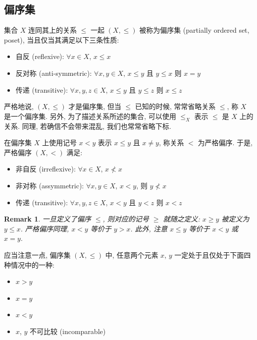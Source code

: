\documentclass[UTF8]{ctexart}
\theoremstyle{mystyle}
\theoremstyle{myremark}
\newtheorem*{remark}{Remark}
\theoremstyle{plain}
\begin{document}
\subsection{偏序集}
\begin{definition}
    集合 $ X $ 连同其上的关系 $ \le $ 一起 $ (X, \le) $ 被称为偏序集 (partially ordered set, poset), 当且仅当其满足以下三条性质:
    \begin{itemize}
        \item 自反 (reflexive): $ \forall x \in X $, $ x \le x $
        \item 反对称 (anti-symmetric): $ \forall x, y \in X $, $ x \le y $ 且 $ y \le x $ 则 $ x = y $
        \item 传递 (transitive): $ \forall x, y, z \in X $, $ x \le y $ 且 $ y \le z $ 则 $ x \le z $
    \end{itemize}
\end{definition}

严格地说, $ (X, \le) $ 才是偏序集, 但当 $ \le $ 已知的时候, 常常省略关系 $ \le $, 称 $ X $ 是一个偏序集. 另外, 为了描述关系所述的集合, 可以使用 $ \le_X $ 表示 $ \le $ 是 $ X $ 上的关系. 同理, 若确信不会带来混乱, 我们也常常省略下标.


\begin{definition}
    在偏序集 $ X $ 上使用记号 $ x < y $ 表示 $ x \le y $ 且 $ x \neq y $, 称关系 $ < $ 为严格偏序. 于是, 严格偏序 $ (X, <) $ 满足:
    \begin{itemize}
        \item 非自反 (irreflexive): $ \forall x \in X $, $ x \not < x $
        \item 非对称 (assymmetric): $ \forall x, y \in X $, $ x < y $, 则 $ y \not < x $
        \item 传递 (transitive): $ \forall x, y, z \in X $, $ x < y $ 且 $ y < z $ 则 $ x < z $
    \end{itemize}
\end{definition}

\begin{remark}
    一旦定义了偏序 $ \le $, 则对应的记号 $ \ge $ 就随之定义: $ x \ge y $ 被定义为 $ y \le x $. 严格偏序同理, $ x < y $ 等价于 $ y > x $. 此外, 注意 $ x \le y $ 等价于 $ x < y $ 或 $ x = y $.
\end{remark}

应当注意一点, 偏序集 $ (X, \le) $ 中, 任意两个元素 $ x $, $ y $ 一定处于且仅处于下面四种情况中的一种:
\begin{itemize}
    \item $ x > y $
    \item $ x = y $
    \item $ x < y $
    \item $ x $, $ y $ 不可比较 (incomparable)
\end{itemize}
\end{document}
